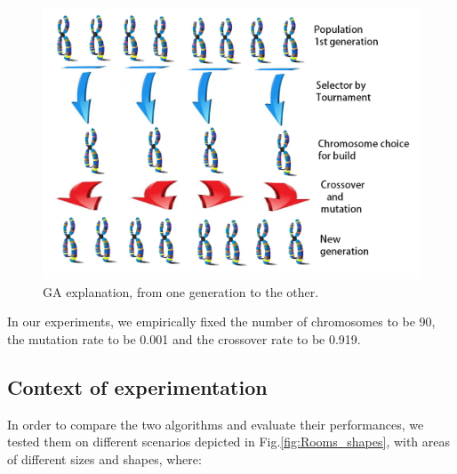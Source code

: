 \begin{figure}[t]
  \includegraphics[width=\linewidth]{figures/GAfinal.jpg}
  \caption{ GA explanation, from one generation to the other.}\label{fig:GAexp}
  \endminipage\hfill
\end{figure}
In our experiments, we empirically fixed %
the number of chromosomes to be 90, the mutation rate to be 0.001 and the crossover rate to be 0.919. 

\subsection{ Context of experimentation }

In order to compare the two algorithms and evaluate their performances, we tested them on different scenarios depicted in Fig.\ref{fig:Rooms_shapes}, with areas  of different sizes and shapes, where: 

